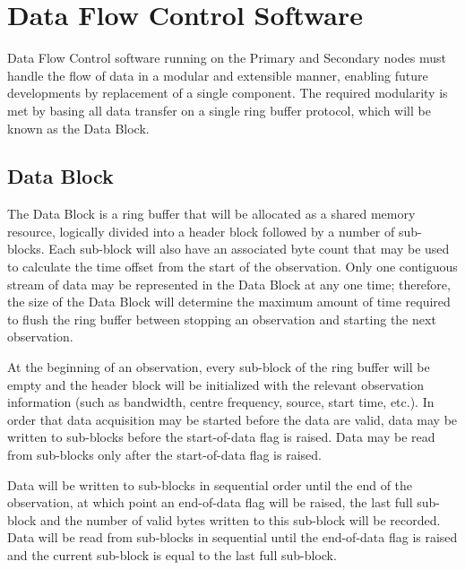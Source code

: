 \chapter{Data Flow Control Software}

Data Flow Control software running on the Primary and Secondary nodes
must handle the flow of data in a modular and extensible manner,
enabling future developments by replacement of a single component.
The required modularity is met by basing all data transfer on a single
ring buffer protocol, which will be known as the Data Block.

\section{Data Block}
\label{sec:data_block}

The Data Block is a ring buffer that will be allocated as a shared
memory resource, logically divided into a header block followed by a
number of sub-blocks.  Each sub-block will also have an associated
byte count that may be used to calculate the time offset from the
start of the observation.  Only one contiguous stream of data may be
represented in the Data Block at any one time; therefore, the size of
the Data Block will determine the maximum amount of time required to
flush the ring buffer between stopping an observation and starting the
next observation.


At the beginning of an observation, every sub-block of the ring buffer
will be empty and the header block will be initialized with the
relevant observation information (such as bandwidth, centre frequency,
source, start time, etc.). In order that data acquisition may be
started before the data are valid, data may be written to sub-blocks
before the start-of-data flag is raised.  Data may be read from
sub-blocks only after the start-of-data flag is raised.


Data will be written to sub-blocks in sequential order until the end
of the observation, at which point an end-of-data flag will be raised,
the last full sub-block and the number of valid bytes written to this
sub-block will be recorded.   Data will be read from sub-blocks in
sequential until the end-of-data flag is raised and the current
sub-block is equal to the last full sub-block.

